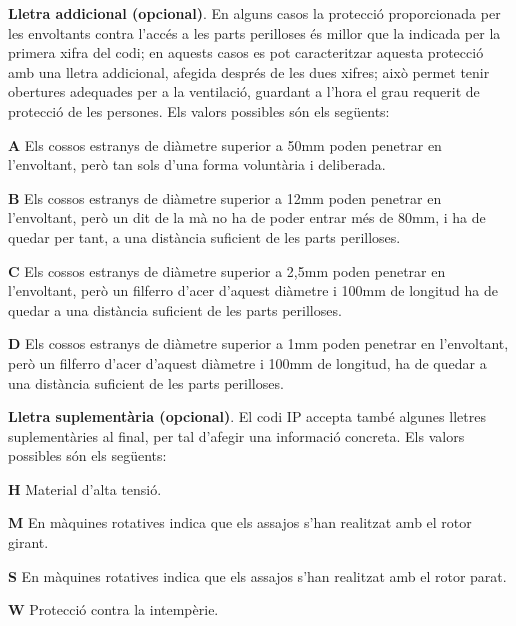 \textbf{Lletra addicional (opcional)}. En alguns casos la protecci\'{o}
proporcionada per les envoltants contra l'acc\'{e}s a les parts
perilloses \'{e}s millor que la indicada per la primera xifra del codi;
en aquests casos es pot caracteritzar aquesta protecci\'{o} amb una
lletra addicional, afegida despr\'{e}s de les dues xifres; aix\`{o} permet
tenir obertures adequades per a la ventilaci\'{o},  guardant a l'hora el
grau requerit de protecci\'{o} de les persones. Els valors possibles s\'{o}n
els seg\"{u}ents:
\begin{list}{}
   {\setlength{\labelwidth}{10mm} \setlength{\leftmargin}{10mm} \setlength{\labelsep}{2mm}}
   \item[\textbf{A}] Els  cossos estranys de di\`{a}metre superior a
   50\unit{mm}    poden penetrar en l'envoltant, per\`{o} tan sols d'una forma volunt\`{a}ria i deliberada.
   \item[\textbf{B}] Els  cossos estranys de di\`{a}metre superior a 12\unit{mm}
    poden penetrar en l'envoltant, per\`{o} un dit de la m\`{a} no ha de poder entrar m\'{e}s de 80\unit{mm}, i
    ha de quedar per tant, a una dist\`{a}ncia    suficient de les parts perilloses.
   \item[\textbf{C}] Els  cossos estranys de di\`{a}metre superior a 2,5\unit{mm}
   poden penetrar en l'envoltant, per\`{o} un filferro d'acer d'aquest di\`{a}metre i 100\unit{mm}
   de longitud ha de quedar a una dist\`{a}ncia suficient de les parts perilloses.
   \item[\textbf{D}] Els  cossos estranys de di\`{a}metre superior a 1\unit{mm}
   poden penetrar en l'envoltant, per\`{o} un filferro d'acer d'aquest di\`{a}metre i 100\unit{mm}
   de longitud, ha de quedar a una dist\`{a}ncia suficient de les parts perilloses.
\end{list}

\textbf{Lletra suplement\`{a}ria (opcional)}. El codi \textsf{IP} accepta tamb\'{e} algunes
lletres suplement\`{a}ries al final, per tal d'afegir una informaci\'{o} concreta. Els valors
possibles s\'{o}n els seg\"{u}ents:
\begin{list}{}
   {\setlength{\labelwidth}{10mm} \setlength{\leftmargin}{10mm} \setlength{\labelsep}{2mm}}
   \item[\textbf{H}] Material d'alta tensi\'{o}.
   \item[\textbf{M}] En m\`{a}quines rotatives indica que els assajos s'han realitzat amb el
    rotor girant.
   \item[\textbf{S}] En m\`{a}quines rotatives indica que els assajos s'han realitzat amb el
    rotor parat.
   \item[\textbf{W}] Protecci\'{o} contra la intemp\`{e}rie.
\end{list}


